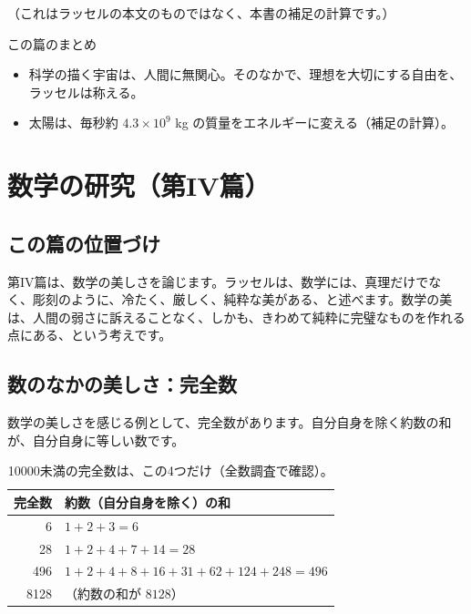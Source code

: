 \documentclass[a4paper,11pt,openany]{ltjsbook}
\begin{document}
（これはラッセルの本文のものではなく、本書の補足の計算です。）

\begin{pointbox}{この篇のまとめ}
\begin{itemize}[leftmargin=*]
\item 科学の描く宇宙は、人間に無関心。そのなかで、理想を大切にする自由を、ラッセルは称える。
\item 太陽は、毎秒約 $4.3\times10^9$ kg の質量をエネルギーに変える（補足の計算）。
\end{itemize}
\end{pointbox}

\chapter{数学の研究（第IV篇）}

\section{この篇の位置づけ}

第IV篇は、数学の美しさを論じます。ラッセルは、数学には、真理だけでなく、彫刻のように、冷たく、厳しく、純粋な美がある、と述べます。数学の美は、人間の弱さに訴えることなく、しかも、きわめて純粋に完璧なものを作れる点にある、という考えです。

\section{数のなかの美しさ：完全数}

数学の美しさを感じる例として、完全数があります。自分自身を除く約数の和が、自分自身に等しい数です。

\begin{table}[htbp]
\centering
\begin{tabular}{rl}
\toprule
完全数 & 約数（自分自身を除く）の和\\
\midrule
6 & $1+2+3=6$\\
28 & $1+2+4+7+14=28$\\
496 & $1+2+4+8+16+31+62+124+248=496$\\
8128 & （約数の和が $8128$）\\
\bottomrule
\end{tabular}
\caption{10000未満の完全数は、この4つだけ（全数調査で確認）。}
\end{table}
\end{document}
